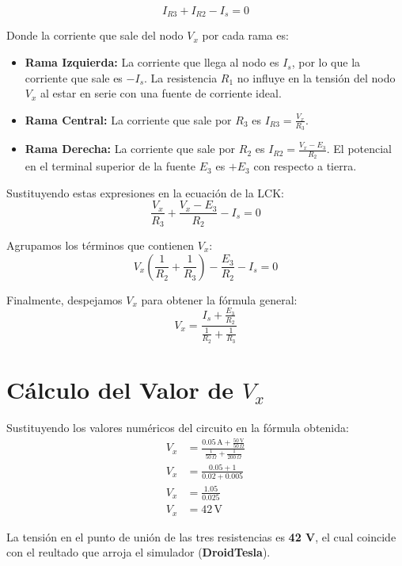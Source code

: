 \documentclass[12pt,a4paper]{article}
\begin{document}
\begin{equation}
    I_{R3} + I_{R2} - I_s = 0
\end{equation}

Donde la corriente que sale del nodo $V_x$ por cada rama es:
\begin{itemize}
    \item \textbf{Rama Izquierda:} La corriente que llega al nodo es $I_s$, por lo que la corriente que sale es $-I_s$. La resistencia $R_1$ no influye en la tensión del nodo $V_x$ al estar en serie con una fuente de corriente ideal.
    \item \textbf{Rama Central:} La corriente que sale por $R_3$ es $I_{R3} = \frac{V_x}{R_3}$.
    \item \textbf{Rama Derecha:} La corriente que sale por $R_2$ es $I_{R2} = \frac{V_x - E_3}{R_2}$. El potencial en el terminal superior de la fuente $E_3$ es $+E_3$ con respecto a tierra.
\end{itemize}

Sustituyendo estas expresiones en la ecuación de la LCK:
\begin{equation}
    \frac{V_x}{R_3} + \frac{V_x - E_3}{R_2} - I_s = 0
\end{equation}

Agrupamos los términos que contienen $V_x$:
\begin{equation}
    V_x \left( \frac{1}{R_2} + \frac{1}{R_3} \right) - \frac{E_3}{R_2} - I_s = 0
\end{equation}

Finalmente, despejamos $V_x$ para obtener la fórmula general:
\begin{equation}
    V_x = \frac{I_s + \frac{E_3}{R_2}}{\frac{1}{R_2} + \frac{1}{R_3}}
\end{equation}

\section{Cálculo del Valor de $V_x$}

Sustituyendo los valores numéricos del circuito en la fórmula obtenida:
\begin{align*}
    V_x &= \frac{0.05 \, \text{A} + \frac{50 \, \text{V}}{50 \, \Omega}}{\frac{1}{50 \, \Omega} + \frac{1}{200 \, \Omega}} \\
    V_x &= \frac{0.05 + 1}{0.02 + 0.005} \\
    V_x &= \frac{1.05}{0.025} \\
    V_x &= 42 \, \text{V}
\end{align*}

La tensión en el punto de unión de las tres resistencias es \textbf{42 V}, el
cual coincide con el reultado que arroja el simulador (\textbf{DroidTesla}).
\end{document}
